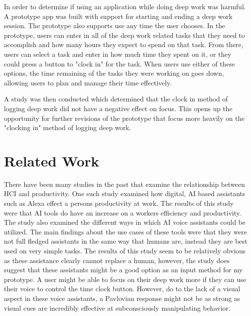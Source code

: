 \documentclass[sigconf]{acmart}
\begin{document}
    In order to determine if using an application while doing deep work was harmful. A prototype app was built with support for starting and ending a deep work session. The prototype also supports use any time the user chooses. In the prototype, users can enter in all of the deep work related tasks that they need to accomplish and how many hours they expect to spend on that task. From there, users can select a task and enter in how much time they spent on it, or they could press a button to "clock in" for the task. When users use either of these options, the time remaining of the tasks they were working on goes down, allowing users to plan and manage their time effectively. 

    A study was then conducted which determined that the clock in method of logging deep work did not have a negative effect on focus. This opens up the opportunity for further revisions of the prototype that focus more heavily on the "clocking in" method of logging deep work.
    

    


\section{Related Work}
There have been many studies in the past that examine the relationship between HCI and productivity. One such study examined how digital, AI based assistants such as Alexa effect a persons productivity at work. The results of this study were that AI tools do have an increase on a workers efficiency and productivity. \cite{alexa} The study also examined the different ways in which AI voice assistants could be utilized. The main findings about the use cases of these tools were that they were not full fledged assistants in the same way that humans are, instead they are best used on very simple tasks\cite{alexa}. The results of this study seem to be relatively obvious as these assistance clearly cannot replace a human, however, the study does suggest that these assistants might be a good option as an input method for my prototype. A user might be able to focus on their deep work more if they can use their voice to control the time clock button. However, do to the lack of a visual aspect in these voice assistants, a Pavlovian response might not be as strong as visual cues are incredibly effective at subconsciously manipulating behavior\cite{visual}.
\end{document}
